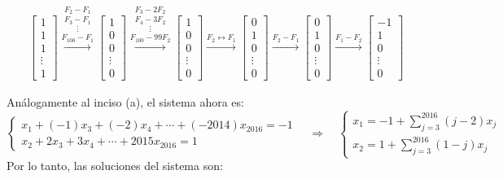 \begin{enumerate}[topsep=6pt, itemsep=.4cm]
\begin{enumerate}
\begin{align*}
&\left[\begin{array}{c} 1\\ 1 \\ 1 \\ \vdots \\1 \end{array}\right]
\stackrel{F_2-F_1}{\stackrel{F_3 - F_1}{\stackrel{\vdots}{\stackrel{F_{100}-F_1}{\longrightarrow}}}}
\left[\begin{array}{c} 1\\ 0 \\ 0 \\ \vdots \\0 \end{array}\right]
\stackrel{F_3-2F_2}{\stackrel{F_4-3F_2}{\stackrel{\vdots}{\stackrel{F_{100}-99F_2}{\longrightarrow}}}}
\left[\begin{array}{c} 1\\ 0 \\ 0 \\ \vdots \\0 \end{array}\right]
\stackrel{F_2 \leftrightarrow F_1}{\longrightarrow}
\left[\begin{array}{c} 0\\ 1 \\ 0 \\ \vdots \\0 \end{array}\right]
\stackrel{F_2-F_1}{\longrightarrow}
\left[\begin{array}{c} 0\\ 1 \\ 0 \\ \vdots \\0 \end{array}\right]
\stackrel{F_1-F_2}{\longrightarrow} 
\left[\begin{array}{c} -1\\ 1 \\ 0 \\ \vdots \\0 \end{array}\right]
\end{align*}

Análogamente al inciso (a), el sistema ahora es:
\begin{equation*}
\begin{cases}
x_1 + (-1)x_3 + (-2)x_4 + \cdots + (-2014)x_{2016} = -1\\
x_2 + 2 x_3 + 3 x_4 + \cdots + 2015 x_{2016} = 1
\end{cases}
\quad \Rightarrow \quad
\begin{cases}
x_1 = -1 + \sum_{j=3}^{2016} (j-2) x_j \\
x_2 = 1 + \sum_{j=3}^{2016} (1-j) x_j
\end{cases}
\end{equation*}
Por lo tanto,  las soluciones del sistema son:


\end{enumerate}
\end{enumerate}
